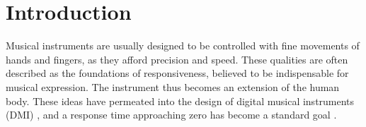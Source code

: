 \documentclass{nime-alternate_MANUSCRIPT} %
\begin{document}
%
% 
%


\printccsdesc

\vspace{0.35cm}	

\section{Introduction}

Musical instruments are usually designed to be controlled with fine movements of hands and fingers, as they afford precision and speed. These qualities are often described as the foundations of responsiveness, believed to be indispensable for musical expression. The instrument thus becomes an extension of the human body. These ideas have permeated into the design of digital musical instruments (DMI) \cite{Moore_1988}, and a response time approaching zero has become a standard goal \cite{Wessel_Wright_2002, Jack_etal_2018, McPherson_etal_2016}.
\end{document}

